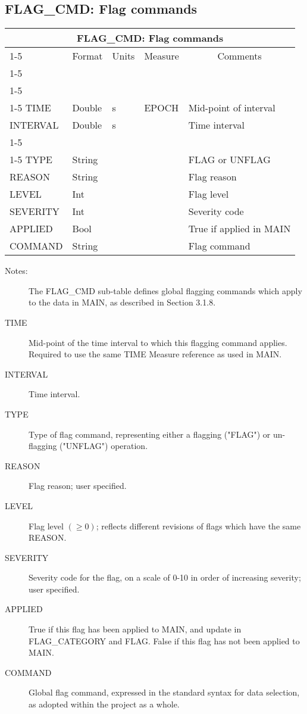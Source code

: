 \documentclass{article}
\newcommand{\defline}[1]{\cline{1-5}
\multicolumn{5}{|l|}{#1} \\
\cline{1-5}}
\newcommand{\definetable}[2]
{
	\vfill\newpage
	\subsection{#1}
        \vspace{0.15in}
        \small
	\begin{tabular}{|l|p{1.25in}|l|p{.9in}|p{1.4in}|}
	\hline
	\multicolumn{5}{|c|}{\bf #1}\\ 
	\cline{1-5}
        \multicolumn{1}{|c|}{Name}&\multicolumn{1}{|c|}{Format}&
        \multicolumn{1}{|c|}{Units}&\multicolumn{1}{|c|}{Measure}&
        \multicolumn{1}{|c|}{Comments}\\
        \cline{1-5}
        #2
        \hline
	\end{tabular}
}
\begin{document}
\definetable{FLAG\_CMD: Flag commands}{
\defline{\bf Columns}
\defline{\em Key}
TIME      &    Double   &   s  &  EPOCH & Mid-point of interval \\
INTERVAL  &    Double   &   s  &        & Time interval \\
\defline{\em Data}  
TYPE      &    String   &      &        & FLAG or UNFLAG\\
REASON    &    String   &      &        & Flag reason\\
LEVEL     &    Int      &      &        & Flag level\\
SEVERITY  &    Int      &      &        & Severity code\\
APPLIED   &    Bool     &      &        & True if applied in MAIN\\
COMMAND   & String  &      &        & Flag command\\
}
\begin{description}

\item[Notes:] The FLAG\_CMD sub-table defines global flagging commands
which apply to the data in MAIN, as described in Section 3.1.8.

\item[TIME] Mid-point of the time interval to which this flagging
command applies. Required to use the same TIME Measure reference as
used in MAIN.

\item[INTERVAL] Time interval.

\item[TYPE] Type of flag command, representing either a flagging
("FLAG") or un-flagging ("UNFLAG") operation.

\item[REASON] Flag reason; user specified.

\item[LEVEL] Flag level $(\geq 0)$; reflects different revisions of
flags which have the same REASON.

\item[SEVERITY] Severity code for the flag, on a scale of 0-10 in
order of increasing severity; user specified.

\item[APPLIED] True if this flag has been applied to MAIN, and update
in FLAG\_CATEGORY and FLAG. False if this flag has not been applied to
MAIN.

\item[COMMAND] Global flag command, expressed in the standard
syntax for data selection, as adopted within the project as a whole.

\end{description}
\end{document}
